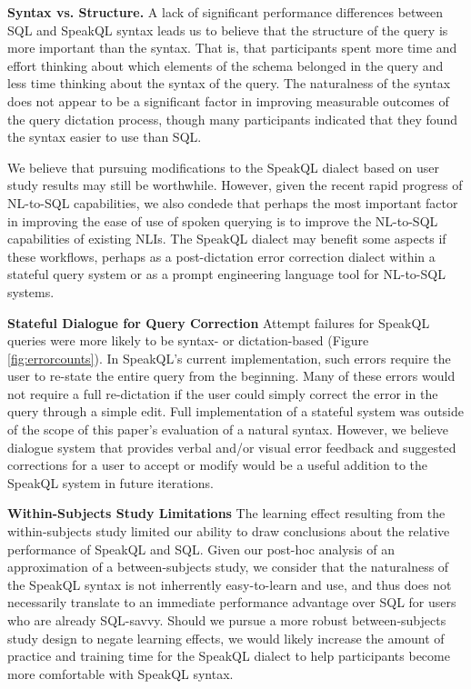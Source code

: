 \textbf{Syntax vs. Structure.} A lack of significant performance differences between SQL and SpeakQL syntax leads us to believe that the structure of the query is more important than the syntax.
That is, that participants spent more time and effort thinking about which elements of the schema belonged in the query and less time thinking about the syntax of the query.
The naturalness of the syntax does not appear to be a significant factor in improving measurable outcomes of the query dictation process, though many participants indicated that they found the syntax easier to use than SQL. 

We believe that pursuing modifications to the SpeakQL dialect based on user study results may still be worthwhile. 
However, given the recent rapid progress of NL-to-SQL capabilities, we also condede that perhaps the most important factor in improving the ease of use of spoken querying is to improve the NL-to-SQL capabilities of existing NLIs.
The SpeakQL dialect may benefit some aspects if these workflows, perhaps as a post-dictation error correction dialect within a stateful query system or as a prompt engineering language tool for NL-to-SQL systems.

\textbf{Stateful Dialogue for Query Correction} Attempt failures for SpeakQL queries were more likely to be syntax- or dictation-based (Figure \ref{fig:errorcounts}). In SpeakQL's current implementation, such errors require the user to re-state the entire query from the beginning. Many of these errors would not require a full re-dictation if the user could simply correct the error in the query through a simple edit. Full  implementation of a stateful system was outside of the scope of this paper's evaluation of a natural syntax. However, we believe dialogue system that provides verbal and/or visual error feedback and suggested corrections for a user to accept or modify would be a useful addition to the SpeakQL system in future iterations.

\textbf{Within-Subjects Study Limitations} The learning effect resulting from the within-subjects study limited our ability to draw conclusions about the relative performance of SpeakQL and SQL. 
Given our post-hoc analysis of an approximation of a between-subjects study, we consider that the naturalness of the SpeakQL syntax is not inherrently easy-to-learn and use, and thus does not necessarily translate to an immediate performance advantage over SQL for users who are already SQL-savvy. 
Should we pursue a more robust between-subjects study design to negate learning effects, we would likely increase the amount of practice and training time for the SpeakQL dialect to help participants become more comfortable with SpeakQL syntax. 





